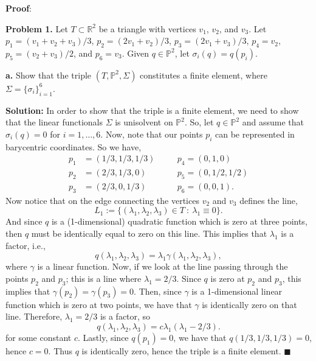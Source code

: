 \documentclass[11pt]{article}
\begin{document}
\vskip 1cm

{\bf Proof}: 

\vskip 2cm



\textbf{Problem 1.} Let $T \subset \mathbb{R}^2$ be a triangle with vertices $v_1$, $v_2$, and $v_3$. 
Let $p_1 = (v_1+v_2+v_3)/3$, $p_2 = (2v_1+v_2)/3$, $p_3 = (2v_1+v_3)/3$, $p_4=v_2$, $p_5 = (v_2+v_3)/2$, and $p_6 = v_3$.
Given $q \in \mathbb{P}^2$, let $\sigma_i(q) = q(p_i)$.


\vskip 1cm

\textbf{a.}  Show that the triple $(T,\mathbb{P}^2, \Sigma)$ constitutes a finite element, where $\Sigma = \{\sigma_i\}^6_{i=1}$.

\vskip 1cm

\textbf{Solution:} In order to show that the triple is a finite element, we need to show that the linear functionals $\Sigma$ is unisolvent on $\mathbb{P}^2$.
So, let $q\in \mathbb{P}^2$ and assume that $\sigma_i(q) = 0$ for $i = 1, \ldots, 6$.
Now, note that our points $p_i$ can be represented in barycentric coordinates.
So we have,
\begin{align*}
    p_1 &= (1/3,1/3,1/3) &&\quad p_4 = (0,1,0) \\
    p_2 &= (2/3, 1/3, 0) &&\quad p_5 = (0, 1/2, 1/2) \\
    p_3 &= (2/3, 0, 1/3) &&\quad p_6 = (0,0,1).
\end{align*}
Now notice that on the edge connecting the vertices $v_2$ and $v_3$ defines the line,
\begin{equation*}
    L_1 := \{ (\lambda_1, \lambda_2, \lambda_3) \in T \: : \: \lambda_1 \equiv 0 \}.
\end{equation*}
And since $q$ is a (1-dimensional) quadratic function which is zero at three points, then $q$ must be identically equal to zero on this line.
This implies that $\lambda_1$ is a factor, i.e.,
\begin{equation*}
    q(\lambda_1, \lambda_2, \lambda_3) = \lambda_1 \gamma(\lambda_1, \lambda_2, \lambda_3),
\end{equation*}
where $\gamma$ is a linear function.
Now, if we look at the line passing through the points $p_2$ and $p_3$; this is a line where $\lambda_1 = 2/3$.
Since $q$ is zero at $p_2$ and $p_3$, this implies that $\gamma(p_2) = \gamma(p_3) = 0$.
Then, since $\gamma$ is a 1-dimensional linear function which is zero at two points, we have that $\gamma$ is identically zero on that line.
Therefore, $\lambda_1 = 2/3$ is a factor, so
\begin{equation*}
    q(\lambda_1, \lambda_2, \lambda_3) = c\lambda_1(\lambda_1 - 2/3).
\end{equation*}
for some constant $c$.
Lastly, since $q(p_1) = 0$, we have that $q(1/3, 1/3, 1/3) = 0$, hence $c = 0$.
Thus $q$ is identically zero, hence the triple is a finite element.
$\blacksquare$
\end{document}
